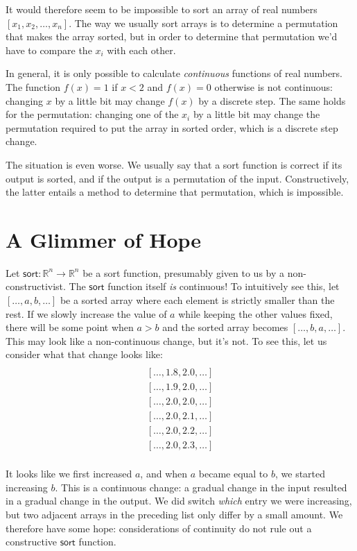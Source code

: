 \documentclass[a4paper, 11pt]{article}
\newcommand{\R}{\mathbb{R}}
\newcommand{\sort}{\mathsf{sort}}
\begin{document}
It would therefore seem to be impossible to sort an array of real numbers $[x_1,x_2,\dots,x_n]$. The way we usually sort arrays is to determine a permutation that makes the array sorted, but in order to determine that permutation we'd have to compare the $x_i$ with each other.

In general, it is only possible to calculate \emph{continuous} functions of real numbers. The function $f(x) = 1$ if $x < 2$ and $f(x) = 0$ otherwise is not continuous: changing $x$ by a little bit may change $f(x)$ by a discrete step. The same holds for the permutation: changing one of the $x_i$ by a little bit may change the permutation required to put the array in sorted order, which is a discrete step change.

The situation is even worse. We usually say that a sort function is correct if its output is sorted, and if the output is a permutation of the input. Constructively, the latter entails a method to determine that permutation, which is impossible.

\section{A Glimmer of Hope}

Let $\mathsf{sort} : \R^n \to \R^n$ be a sort function, presumably given to us by a non-constructivist. The $\sort$ function itself \emph{is} continuous! To intuitively see this, let $[\dots, a, b, \dots]$ be a sorted array where each element is strictly smaller than the rest. If we slowly increase the value of $a$ while keeping the other values fixed, there will be some point when $a > b$ and the sorted array becomes $[\dots, b, a, \dots]$. This may look like a non-continuous change, but it's not. To see this, let us consider what that change looks like:
\begin{align*}
  [\dots, 1.7, 2.0, \dots] \\
  [\dots, 1.8, 2.0, \dots] \\
  [\dots, 1.9, 2.0, \dots] \\
  [\dots, 2.0, 2.0, \dots] \\
  [\dots, 2.0, 2.1, \dots] \\
  [\dots, 2.0, 2.2, \dots] \\
  [\dots, 2.0, 2.3, \dots] \\
\end{align*}

It looks like we first increased $a$, and when $a$ became equal to $b$, we started increasing $b$. This is a continuous change: a gradual change in the input resulted in a gradual change in the output. We did switch \emph{which} entry we were increasing, but two adjacent arrays in the preceding list only differ by a small amount. We therefore have some hope: considerations of continuity do not rule out a constructive $\sort$ function.
\end{document}

